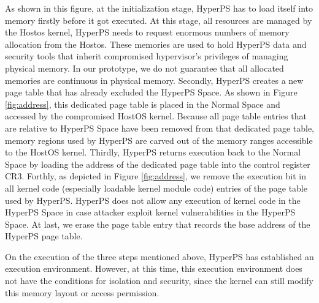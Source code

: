 As shown in this figure, at the initialization stage, HyperPS has to load itself into memory firstly before it got executed. 
At this stage, all resources are managed by the Hostos kernel, HyperPS needs to request enormous numbers of memory allocation from the Hostos. These memories are used to hold HyperPS data and security tools that inherit compromised hypervisor's privileges of managing physical memory. 
In our prototype, we do not guarantee that all allocated memories are continuous in physical memory. 
Secondly, HyperPS creates a new page table that has already excluded the HyperPS Space. As shown in Figure \ref{fig:address}, this dedicated page table is placed in the Normal Space and accessed by the compromised HostOS kernel. 
Because all page table entries that are relative to HyperPS Space have been removed from that dedicated page table, 
memory regions used by HyperPS are carved out of the memory ranges accessible to the HostOS kernel. 
Thirdly, HyperPS returns execution back to the Normal Space by loading the address of the dedicated page table into the control register CR3. 
Forthly, as depicted in Figure \ref{fig:address}, we remove the execution bit in all kernel code (especially loadable kernel module code) entries of the page table used by HyperPS. 
HyperPS does not allow any execution of kernel code in the HyperPS Space in case attacker exploit kernel vulnerabilities in the HyperPS Space.
At last, we erase the page table entry that records the base address of the HyperPS page table.

On the execution of the three steps mentioned above, HyperPS has established an execution environment. 
However, at this time, this execution environment does not have the conditions for isolation and security, since the kernel can still modify this memory layout or access permission. 


